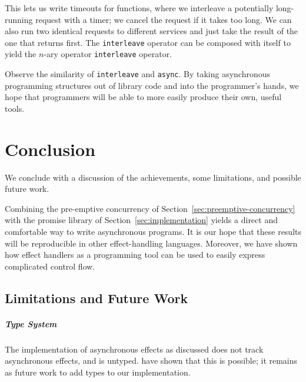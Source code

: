 \documentclass[msc,deptreport,cs]{infthesis} %
\newcommand{\code}[1]{\lstinline{#1}}
\newcommand{\todo}[1]
           {{\par\noindent\small\color{RoyalPurple}
  \framebox{\parbox{\dimexpr\linewidth-2\fboxsep-2\fboxrule}
    {\textbf{TODO:} #1}}}}
\begin{document}



This lets us write timeouts for functions, where we interleave a potentially
long-running request with a timer; we cancel the request if it takes too long.
We can also run two identical requests to different services and just take the
result of the one that returns first. The \code{interleave} operator can be
composed with itself to yield the $n$-ary operator \code{interleave} operator.


Observe the similarity of \code{interleave} and \code{async}. By taking
asynchronous programming structures out of library code and into the
programmer's hands, we hope that programmers will be able to more easily produce
their own, useful tools.


\chapter{Conclusion}
\label{chap:conclusion}

We conclude with a discussion of the achievements, some limitations, and
possible future work.

Combining the pre-emptive concurrency of
Section~\ref{sec:preemptive-concurrency} with the promise library of
Section~\ref{sec:implementation} yields a direct and comfortable way to write
asynchronous programs. It is our hope that these results will be reproducible in
other effect-handling languages.
%
Moreover, we have shown how effect handlers as a programming tool can be used to
easily express complicated control flow.

\todo{Add more to end of paragraph}

\section{Limitations and Future Work}

\paragraph*{Type System}
The implementation of asynchronous effects as discussed does not track
asynchronous effects, and is untyped. \citeauthor{ahman2020asynchronous} have
shown that this is possible; it remains as future work to add types to our
implementation.
\end{document}
